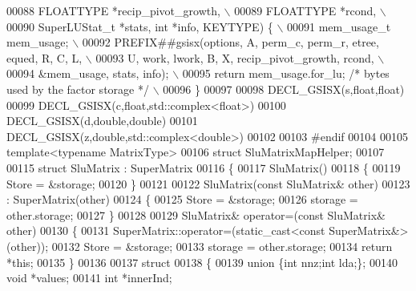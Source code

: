 \begin{DoxyCode}
00088 \textcolor{preprocessor}{         FLOATTYPE *recip\_pivot\_growth,                                                         \(\backslash\)}
00089 \textcolor{preprocessor}{         FLOATTYPE *rcond,                                                                      \(\backslash\)}
00090 \textcolor{preprocessor}{         SuperLUStat\_t *stats, int *info, KEYTYPE) \{                                            \(\backslash\)}
00091 \textcolor{preprocessor}{    mem\_usage\_t mem\_usage;                                                              \(\backslash\)}
00092 \textcolor{preprocessor}{    PREFIX##gsisx(options, A, perm\_c, perm\_r, etree, equed, R, C, L,                            \(\backslash\)}
00093 \textcolor{preprocessor}{         U, work, lwork, B, X, recip\_pivot\_growth, rcond,                                       \(\backslash\)}
00094 \textcolor{preprocessor}{         &mem\_usage, stats, info);                                                              \(\backslash\)}
00095 \textcolor{preprocessor}{    return mem\_usage.for\_lu; }\textcolor{comment}{/* bytes used by the factor storage */}\textcolor{preprocessor}{                             \(\backslash\)}
00096 \textcolor{preprocessor}{  \}}
00097 
00098 DECL\_GSISX(s,\textcolor{keywordtype}{float},\textcolor{keywordtype}{float})
00099 DECL\_GSISX(c,\textcolor{keywordtype}{float},std::complex<float>)
00100 DECL\_GSISX(d,\textcolor{keywordtype}{double},\textcolor{keywordtype}{double})
00101 DECL\_GSISX(z,\textcolor{keywordtype}{double},std::complex<double>)
00102 
00103 \textcolor{preprocessor}{#endif}
00104 
00105 \textcolor{keyword}{template}<\textcolor{keyword}{typename} MatrixType>
00106 \textcolor{keyword}{struct }SluMatrixMapHelper;
00107 
00115 \textcolor{keyword}{struct }SluMatrix : SuperMatrix
00116 \{
00117   SluMatrix()
00118   \{
00119     Store = &storage;
00120   \}
00121 
00122   SluMatrix(\textcolor{keyword}{const} SluMatrix& other)
00123     : SuperMatrix(other)
00124   \{
00125     Store = &storage;
00126     storage = other.storage;
00127   \}
00128 
00129   SluMatrix& operator=(\textcolor{keyword}{const} SluMatrix& other)
00130   \{
00131     SuperMatrix::operator=(static\_cast<const SuperMatrix&>(other));
00132     Store = &storage;
00133     storage = other.storage;
00134     \textcolor{keywordflow}{return} *\textcolor{keyword}{this};
00135   \}
00136 
00137   \textcolor{keyword}{struct}
00138   \{
00139     \textcolor{keyword}{union }\{\textcolor{keywordtype}{int} nnz;\textcolor{keywordtype}{int} lda;\};
00140     \textcolor{keywordtype}{void} *values;
00141     \textcolor{keywordtype}{int} *innerInd;

\end{DoxyCode}
